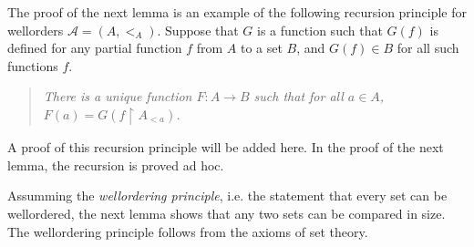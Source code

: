 \documentclass[a4paper, 11pt]{amsart}
\theoremstyle{remark}
\newcommand{\cA}{\mathcal A}
\begin{document}
The proof of the next lemma is an example of the following recursion principle for wellorders $\cA=(A,<_A)$. 
Suppose that $G$ is a function such that $G(f)$ is defined for any partial function $f$ from $A$ to a set $B$, and $G(f)\in B$ for all such functions $f$. 

\begin{quote} 
\emph{There is a unique function $F\colon A\rightarrow B$ such that for all $a\in A$, $F(a)=G(f{\upharpoonright}A_{<a})$. } 
\end{quote} 

A proof of this recursion principle will be added here. 
In the proof of the next lemma, the recursion is proved ad hoc. 

Assumming the \emph{wellordering principle}, i.e. the statement that every set can be wellordered, the next lemma shows that any two sets can be compared in size. 
The wellordering principle follows from the axioms of set theory.  
\end{document}
